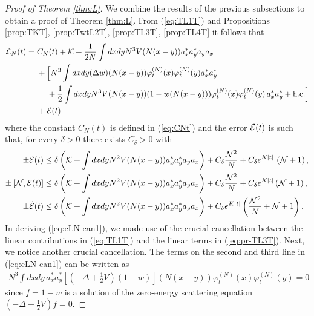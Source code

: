 \documentclass[11pt,a4paper]{article}
\newcommand{\ech}[2]{#2}	%
\newcommand{\ekt}{e^{K\lvert t\rvert}}	%
\newcommand{\cE}{{\cal E}}
\newcommand{\cK}{{\cal K}}
\newcommand{\cL}{{\cal L}}
\newcommand{\cN}{{\cal N}}
\newcommand{\Ncal}{\mathcal{N}}		%
\begin{document}
\begin{proof}[Proof of Theorem \ref{thm:L}]
We combine the results of the previous subsections to obtain a proof of Theorem \ref{thm:L}. {F}rom (\ref{eq:TL1T}) and Propositions \ref{prop:TKT}, \ref{prop:TwtL2T}, \ref{prop:TL3T}, \ref{prop:TL4T} it follows that
\begin{equation}\label{eq:cLN-can1} \begin{split} 
\cL_N (t) = \; &C_N (t) + \cK  + \frac{1}{2N}  \int dx dy N^3 V (N (x-y)) a_x^* a_y^* a_y a_x \\
&+ \Big[ N^3 \int dx dy (\Delta w) (N (x-y)) \varphi_t^{(N)} (x) \varphi_t^{(N)} (y)  a_x^* a_y^* \\ 
&\quad\;+ \frac{1}{2} \int dx dy N^3 V(N (x-y)) (1- w(N(x-y))) \varphi_t^{(N)} (x) \varphi_t^{(N)} (y)\, a_x^* a_y^*%
+ \text{h.c.} \Big]  
\\ &+ \cE (t) 
\end{split} \end{equation}
where the constant $C_N (t)$ is defined in (\ref{eq:CNt}) and the error $\cE (t)$ is such that, for every $\delta > 0$ there exists $C_\delta > 0$ with
\begin{equation}\label{eq:cE-tot}
\begin{split} \pm \cE (t) &\leq \delta \left( \cK + \int dx dy N^2 V(N
(x-y)) a_x^* a_y^* a_y a_x \right) + C_\delta \frac{\cN^2}{N} + C_\delta
\ech{\| \varphi_t^{(N)} \|_{H^2}^2}{\ekt} \, \left( \cN + 1 \right), \\
\pm \left[ \cN ,  \cE (t)\right]  &\leq \delta \left( \cK + \int dx dy N^2
V(N (x-y)) a_x^* a_y^* a_y a_x \right) + C_\delta \frac{\cN^2}{N}  +
C_\delta \ech{\| \varphi^{(N)}_t \|_{H^2}^2}{\ekt} \left( \cN + 1 \right),\\
\pm \dot{\cE} (t) & \leq \delta \left( \cK + \int dx dy N^2 V(N (x-y)) a_x^* a_y^* a_y a_x \right) + \ech{C_\delta \| \varphi_t^{(N)} \|_{H^4}^2 \frac{\cN^2}{N} \\ &\hspace{.5cm} + C_\delta \left( \| \varphi_t^{(N)} \|_{H^4}  \| \varphi_t^{(N)} \|_{H^2} + \| \varphi_t^{(N)} \|_{H^2}^3 \right) \left(\cN+1 \right)}{C_\delta \ekt \left( \frac{\Ncal^2}{N}+\Ncal+1\right)}. 
\end{split} \end{equation}
In deriving (\ref{eq:cLN-can1}), we made use of the crucial cancellation between the linear contributions in (\ref{eq:TL1T}) and the linear terms in (\ref{eq:pr-TL3T}).  Next, we notice another crucial cancellation. The terms on the second and third line in (\ref{eq:cLN-can1}) can be written as
\[ \begin{split} 
N^3 \int dx dy \, a_x^* a_y^* \left[ \left(-\Delta +\frac{1}{2} V \right)(1-w) \right](N(x-y)) \varphi_t^{(N)} (x) \varphi_t^{(N)} (y) = 0 
\end{split}\]
since $f = 1-w$ is a solution of the zero-energy scattering equation $(-\Delta + \frac{1}{2} V)f = 0$.


\end{proof}
\end{document}
